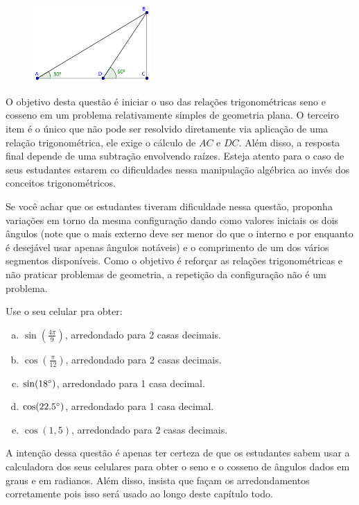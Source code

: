 \documentclass[main_estudante.tex]{subfiles}
\begin{document}
\begin{figure}[h]
\centering
\includegraphics[width=0.4\textwidth]{./img/c4q1.png}
\end{figure}

O objetivo desta questão é iniciar o uso das relações trigonométricas seno e cosseno em um problema relativamente simples de geometria plana. O terceiro item é o único que não pode ser resolvido diretamente via aplicação de uma relação trigonométrica, ele exige o cálculo de $AC$ e $DC$. Além disso, a resposta final depende de uma subtração envolvendo raízes. Esteja atento para o caso de seus estudantes estarem co dificuldades nessa manipulação algébrica ao invés dos conceitos trigonométricos.

Se você achar que os estudantes tiveram dificuldade nessa questão, proponha variações em torno da mesma configuração dando como valores iniciais os dois ângulos (note que o mais externo deve ser menor do que o interno e por enquanto é desejável usar apenas ângulos notáveis) e o comprimento de um dos vários segmentos disponíveis. Como o objetivo é reforçar as relações trigonométricas e não praticar problemas de geometria, a repetição da configuração não é um problema.

\begin{questao}
Use o seu celular pra obter:
\begin{enumerate}[a)]
\item $\sin(\frac{4\pi}{9})$, arredondado para 2 casas decimais.
\item $\cos(\frac{\pi}{12})$, arredondado para 2 casas decimais.
\item $\sin(18\degree)$, arredondado para 1 casa decimal.
\item $\cos(22.5\degree)$, arredondado para 1 casa decimal.
\item $\cos(1,5)$, arredondado para 2 casas decimais.
\end{enumerate}
\end{questao}

A intenção dessa questão é apenas ter certeza de que os estudantes sabem usar a calculadora dos seus celulares para obter o seno e o cosseno de ângulos dados em graus e em radianos. Além disso, insista que façam os arredondamentos corretamente pois isso será usado ao longo deste capítulo todo.
\end{document}
